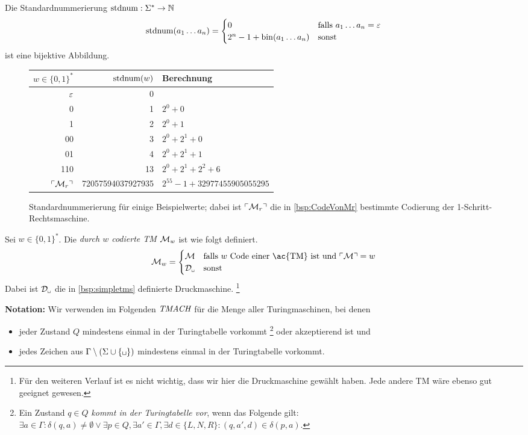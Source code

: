 \begin{lemma}\label{satz:stdnum}
Die Standardnummerierung $\operatorname{stdnum}: \Sigma^*\rightarrow\mathbb{N}$ 
 $$ \operatorname{stdnum}(a_1\dots a_n)=\begin{cases}
0 & \text{falls } a_1\dots a_n=\varepsilon\\
2^{n}-1+\operatorname{bin}(a_1\dots a_n) & \text{sonst}
\end{cases}$$
ist eine bijektive Abbildung.
\end{lemma}


 \begin{figure}[H]\centering
    \begin{tabular}{rr@{\qquad}l}
    $w\in\{0,1\}^*$ & $\operatorname{stdnum}(w)$ & Berechnung\\ \hline
    $\varepsilon$ & 0 \\
    0 & 1 & $2^0 + 0$\\
    1 & 2 & $2^0 + 1$\\
    00 & 3 & $2^0 + 2^1 + 0$\\
    01 & 4 & $2^0 + 2^1 + 1$\\
    110 & 13 & $2^0 + 2^1 + 2^2 + 6$\\
    $\ulcorner \mathcal{M}_r \urcorner$ & 72057594037927935 & $2^{55} - 1 + 32977455905055295$
    \end{tabular}

	\caption{Standardnummerierung für einige Beispielwerte; dabei ist $\ulcorner \mathcal{M}_r \urcorner$
	die in \autoref{bsp:CodeVonMr} bestimmte Codierung der 1-Schritt-Rechtsmaschine.}
\end{figure}


\begin{Def}
 Sei $w\in\{0,1\}^*$.
 Die \emph{durch $w$ codierte \ac{TM}} $\mathcal{M}_w$ ist wie folgt definiert.
 $$\M_w=\begin{cases}
\M & \text{falls } w \text{ Code einer \ac{TM} ist und } \godel{\M}=w\\
\D_\mblank & \text{sonst}
\end{cases}$$
Dabei ist $\D_\mblank$ die in \autoref{bsp:simpletms} definierte Druckmaschine.%
\footnote{Für den weiteren Verlauf ist es nicht wichtig, dass wir hier die Druckmaschine gewählt haben. Jede andere \ac{TM} wäre ebenso gut geeignet gewesen.}
\end{Def}

\textbf{Notation:}
Wir verwenden im Folgenden $\textit{TMACH}$ für die Menge aller Turingmaschinen, bei denen 
\begin{itemize}
 \item jeder Zustand $Q$ mindestens einmal in der Turingtabelle vorkommt%
 \footnote{Ein Zustand $q\in Q$ \emph{kommt in der Turingtabelle vor}, wenn das Folgende gilt:
 $\exists a\in\Gamma: \delta(q,a)\neq\emptyset\lor \exists p\in Q, \exists a'\in\Gamma, \exists d\in\{L,N,R\}: (q,a',d)\in\delta(p,a)$.}
 oder akzeptierend ist und
 \item jedes Zeichen aus $\Gamma\setminus(\Sigma\cup\{\mblank\})$ mindestens einmal in der Turingtabelle vorkommt.
\end{itemize}


